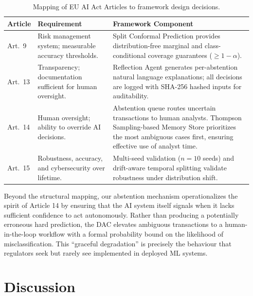 \documentclass[12pt,a4paper]{article}
\begin{document}
\begin{table}[htbp]
  \centering
  \caption{Mapping of EU AI Act Articles to framework design decisions.}
  \label{tab:eu_ai_act}
  \begin{tabular}{p{1.6cm}p{3.0cm}p{3.2cm}}
    \toprule
    \textbf{Article} & \textbf{Requirement} & \textbf{Framework Component} \\
    \midrule
    Art.\ 9 & Risk management system; measurable accuracy thresholds. &
      Split Conformal Prediction provides distribution-free marginal and
      class-conditional coverage guarantees ($\geq 1-\alpha$). \\
    \addlinespace
    Art.\ 13 & Transparency; documentation sufficient for human oversight. &
      Reflection Agent generates per-abstention natural language explanations;
      all decisions are logged with SHA-256 hashed inputs for auditability. \\
    \addlinespace
    Art.\ 14 & Human oversight; ability to override AI decisions. &
      Abstention queue routes uncertain transactions to human analysts.
      Thompson Sampling-based Memory Store prioritizes the most ambiguous
      cases first, ensuring effective use of analyst time. \\
    \addlinespace
    Art.\ 15 & Robustness, accuracy, and cybersecurity over lifetime. &
      Multi-seed validation ($n{=}10$ seeds) and drift-aware temporal splitting
      validate robustness under distribution shift. \\
    \bottomrule
  \end{tabular}
\end{table}

Beyond the structural mapping, our abstention mechanism operationalizes the
spirit of Article 14 by ensuring that the AI system itself signals when it lacks
sufficient confidence to act autonomously. Rather than producing a potentially
erroneous hard prediction, the DAC elevates ambiguous transactions to a
human-in-the-loop workflow with a formal probability bound on the likelihood
of misclassification. This ``graceful degradation'' is precisely the behaviour
that regulators seek but rarely see implemented in deployed ML systems.

\section{Discussion}
\label{sec:discussion}
\end{document}

